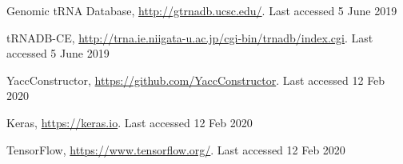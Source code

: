 \documentclass[runningheads]{llncs}
\begin{document}
\begin{thebibliography}{14}
Genomic tRNA Database, \url{http://gtrnadb.ucsc.edu/}. Last accessed 5 June 2019

tRNADB-CE, \url{http://trna.ie.niigata-u.ac.jp/cgi-bin/trnadb/index.cgi}. Last accessed 5 June 2019

YaccConstructor, \url{https://github.com/YaccConstructor}. Last accessed 12 Feb 2020

Keras, \url{https://keras.io}. Last accessed 12 Feb 2020

TensorFlow, \url{https://www.tensorflow.org/}. Last accessed 12 Feb 2020

\end{thebibliography}
\end{document}
